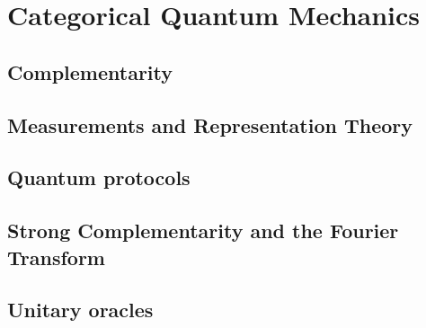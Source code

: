 \chapter{Categorical Quantum Mechanics}

\todo{\chapabstract{}}

\begin{defn}
\end{defn}

\begin{defn}
\end{defn}

\section{Complementarity}
\begin{defn}
\end{defn}

\begin{defn}
\end{defn}

\section{Measurements and Representation Theory}

\section{Quantum protocols}

\section{Strong Complementarity and the Fourier Transform}

\section{Unitary oracles}
